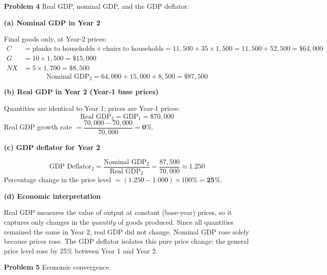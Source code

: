 \documentclass[12pt]{article}
\newenvironment{soln}{%
  \begin{tcolorbox}[
    breakable,
    colback=blue!4!white,
    colframe=blue!50!black,
    title={\textbf{Solution}},
    fonttitle=\small,
    left=4pt, right=4pt, top=4pt, bottom=4pt
  ]
}{%
  \end{tcolorbox}
}
\begin{document}


\noindent\textbf{Problem 4} \quad Real GDP, nominal GDP, and the GDP deflator.

\begin{soln}
\textbf{(a) Nominal GDP in Year 2}

Final goods only, at Year-2 prices:
\begin{align*}
  C &= \text{planks to households} + \text{chairs to households}
       = 11{,}500 + 35 \times 1{,}500 = 11{,}500 + 52{,}500 = \$64{,}000 \\
  G &= 10 \times 1{,}500 = \$15{,}000 \\
  NX &= 5 \times 1{,}700 = \$8{,}500
\end{align*}
\[
  \text{Nominal GDP}_2 = 64{,}000 + 15{,}000 + 8{,}500 = \boxed{\$87{,}500}
\]

\textbf{(b) Real GDP in Year 2 (Year-1 base prices)}

Quantities are identical to Year 1; prices are Year-1 prices:
\[
  \text{Real GDP}_2 = \text{GDP}_1 = \$70{,}000
\]
Real GDP growth rate $= \dfrac{70{,}000 - 70{,}000}{70{,}000} = \mathbf{0\%}$.

\textbf{(c) GDP deflator for Year 2}

\[
  \text{GDP Deflator}_2 = \frac{\text{Nominal GDP}_2}{\text{Real GDP}_2}
  = \frac{87{,}500}{70{,}000} \approx 1.250
\]
Percentage change in the price level $= (1.250 - 1.000) \times 100\% = \mathbf{25\%}$.

\textbf{(d) Economic interpretation}

Real GDP measures the value of output at constant (base-year) prices, so it
captures only changes in the \emph{quantity} of goods produced.  Since all
quantities remained the same in Year 2, real GDP did not change.  Nominal GDP
rose solely because prices rose.  The GDP deflator isolates this pure price
change: the general price level rose by 25\% between Year 1 and Year 2.
\end{soln}

\bigskip
\newpage
\noindent\textbf{Problem 5} \quad Economic convergence.
\end{document}
